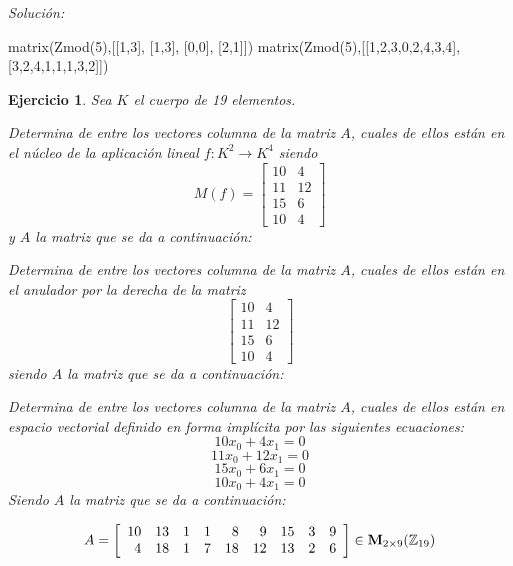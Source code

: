 \documentclass[12pt]{amsart}
\newtheorem{ejer}{Ejercicio}
\begin{document}
{\it Soluci\'on:}

\begin{sageblock}
matrix(Zmod(5),[[1,3],
[1,3],
[0,0],
[2,1]])
matrix(Zmod(5),[[1,2,3,0,2,4,3,4],
[3,2,4,1,1,1,3,2]])
\end{sageblock}



\begin{ejer} Sea $K$ el cuerpo de 19 elementos.
\newline
\noindent\begin{minipage}{\textwidth}
\begin{tcolorbox}[colback = green!20!white,title=Versión Núcleo]
Determina de entre los vectores columna de la matriz $A$, cuales de ellos están en el núcleo de la aplicación lineal $f:K^{2} \to K^{4}$ siendo  $$ M(f) = \left[\begin{array}{rr}
10 & 4 \\
11 & 12 \\
15 & 6 \\
10 & 4
\end{array}\right] $$ y $A$ la matriz que se da a continuación:\end{tcolorbox}
\end{minipage} \newline
\noindent\begin{minipage}{\textwidth}
\begin{tcolorbox}[colback = blue!20!white,title=Versión Anulador]
Determina de entre los vectores columna de la matriz $A$, cuales de ellos están en el anulador por la derecha de la matriz $$ \left[\begin{array}{rr}
10 & 4 \\
11 & 12 \\
15 & 6 \\
10 & 4
\end{array}\right] $$ siendo $A$ la matriz que se da a continuación:\end{tcolorbox}
\end{minipage} \newline
\noindent\begin{minipage}{\textwidth} 
\begin{tcolorbox}[colback = red!20!white,title=Versión Ecuaciones Implícitas]
Determina de entre los vectores columna de la matriz $A$, cuales de ellos están en espacio vectorial definido en forma implícita por las siguientes ecuaciones:
\[ 10 x_{0} + 4 x_{1} = 0 \]
\[ 11 x_{0} + 12 x_{1} = 0 \]
\[ 15 x_{0} + 6 x_{1} = 0 \]
\[ 10 x_{0} + 4 x_{1} = 0 \]
Siendo $A$ la matriz que se da a continuación:
\end{tcolorbox}
\end{minipage}
\[ A = \left[\begin{array}{rrrrrrrrr}
10 & 13 & 1 & 1 & 8 & 9 & 15 & 3 & 9 \\
4 & 18 & 1 & 7 & 18 & 12 & 13 & 2 & 6
\end{array}\right] \in {\bf M}_{2\times 9}({\mathbb Z}_{19})\]
\end{ejer}
\end{document}
